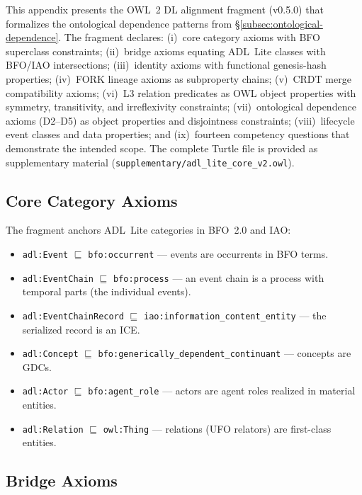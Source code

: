 This appendix presents the OWL~2 DL alignment fragment (v0.5.0) that formalizes the ontological dependence patterns from \S\ref{subsec:ontological-dependence}. The fragment declares: (i)~core category axioms with BFO superclass constraints; (ii)~bridge axioms equating ADL~Lite classes with BFO/IAO intersections; (iii)~identity axioms with functional genesis-hash properties; (iv)~FORK lineage axioms as subproperty chains; (v)~CRDT merge compatibility axioms; (vi)~L3 relation predicates as OWL object properties with symmetry, transitivity, and irreflexivity constraints; (vii)~ontological dependence axioms (D2--D5) as object properties and disjointness constraints; (viii)~lifecycle event classes and data properties; and (ix)~fourteen competency questions that demonstrate the intended scope. The complete Turtle file is provided as supplementary material (\texttt{supplementary/adl\_lite\_core\_v2.owl}).

\subsection{Core Category Axioms}

The fragment anchors ADL~Lite categories in BFO~2.0 and IAO:
\begin{itemize}[leftmargin=2em]
    \item \texttt{adl:Event} $\sqsubseteq$ \texttt{bfo:occurrent} --- events are occurrents in BFO terms.
    \item \texttt{adl:EventChain} $\sqsubseteq$ \texttt{bfo:process} --- an event chain is a process with temporal parts (the individual events).
    \item \texttt{adl:EventChainRecord} $\sqsubseteq$ \texttt{iao:information\_content\_entity} --- the serialized record is an ICE.
    \item \texttt{adl:Concept} $\sqsubseteq$ \texttt{bfo:generically\_dependent\_continuant} --- concepts are GDCs.
    \item \texttt{adl:Actor} $\sqsubseteq$ \texttt{bfo:agent\_role} --- actors are agent roles realized in material entities.
    \item \texttt{adl:Relation} $\sqsubseteq$ \texttt{owl:Thing} --- relations (UFO relators) are first-class entities.
\end{itemize}

\subsection{Bridge Axioms}

